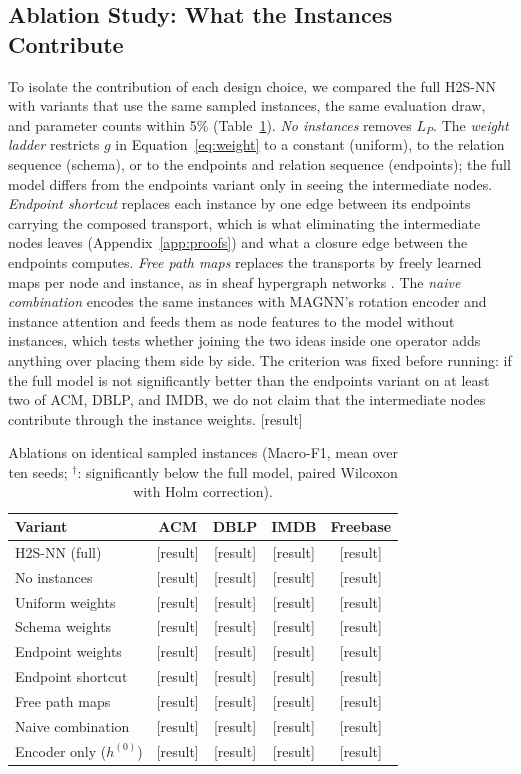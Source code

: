\documentclass{article}
\newcommand{\method}{\textsc{H2S-NN}}
\newcommand{\res}{{\scriptsize[result]}}
\begin{document}
\subsection{Ablation Study: What the Instances Contribute}
To isolate the contribution of each design choice, we compared the full \method{} with variants that use the same sampled instances, the same evaluation draw, and parameter counts within 5\% (Table~\ref{tab:ablation}). \emph{No instances} removes $L_P$. The \emph{weight ladder} restricts $g$ in Equation~\eqref{eq:weight} to a constant (uniform), to the relation sequence (schema), or to the endpoints and relation sequence (endpoints); the full model differs from the endpoints variant only in seeing the intermediate nodes. \emph{Endpoint shortcut} replaces each instance by one edge between its endpoints carrying the composed transport, which is what eliminating the intermediate nodes leaves (Appendix~\ref{app:proofs}) and what a closure edge between the endpoints computes. \emph{Free path maps} replaces the transports by freely learned maps per node and instance, as in sheaf hypergraph networks \cite{duta2023sheafhyper}. The \emph{naive combination} encodes the same instances with MAGNN's rotation encoder and instance attention and feeds them as node features to the model without instances, which tests whether joining the two ideas inside one operator adds anything over placing them side by side. The criterion was fixed before running: if the full model is not significantly better than the endpoints variant on at least two of ACM, DBLP, and IMDB, we do not claim that the intermediate nodes contribute through the instance weights. \res{}

\begin{table}[t]
  \centering
  \caption{Ablations on identical sampled instances (Macro-F1, mean over ten seeds; $^\dagger$: significantly below the full model, paired Wilcoxon with Holm correction).}
  \label{tab:ablation}
  \footnotesize
  \setlength{\tabcolsep}{3pt}
  \begin{tabular}{lcccc}
    \toprule
    \textbf{Variant} & ACM & DBLP & IMDB & Freebase \\
    \midrule
    \method{} (full) & \res & \res & \res & \res \\
    No instances & \res & \res & \res & \res \\
    Uniform weights & \res & \res & \res & \res \\
    Schema weights & \res & \res & \res & \res \\
    Endpoint weights & \res & \res & \res & \res \\
    Endpoint shortcut & \res & \res & \res & \res \\
    Free path maps & \res & \res & \res & \res \\
    Naive combination & \res & \res & \res & \res \\
    Encoder only ($h^{(0)}$) & \res & \res & \res & \res \\
    \bottomrule
  \end{tabular}
\end{table}
\end{document}
